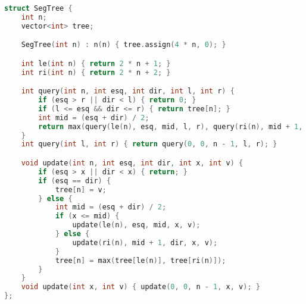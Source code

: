 \documentclass[11pt, a4paper, twoside]{article}
\begin{document}
\begin{lstlisting}[language=C++]
struct SegTree {
    int n;
    vector<int> tree;

    SegTree(int n) : n(n) { tree.assign(4 * n, 0); }

    int le(int n) { return 2 * n + 1; }
    int ri(int n) { return 2 * n + 2; }

    int query(int n, int esq, int dir, int l, int r) {
        if (esq > r || dir < l) { return 0; }
        if (l <= esq && dir <= r) { return tree[n]; }
        int mid = (esq + dir) / 2;
        return max(query(le(n), esq, mid, l, r), query(ri(n), mid + 1, dir, l, r));
    }
    int query(int l, int r) { return query(0, 0, n - 1, l, r); }

    void update(int n, int esq, int dir, int x, int v) {
        if (esq > x || dir < x) { return; }
        if (esq == dir) {
            tree[n] = v;
        } else {
            int mid = (esq + dir) / 2;
            if (x <= mid) {
                update(le(n), esq, mid, x, v);
            } else {
                update(ri(n), mid + 1, dir, x, v);
            }
            tree[n] = max(tree[le(n)], tree[ri(n)]);
        }
    }
    void update(int x, int v) { update(0, 0, n - 1, x, v); }
};
\end{lstlisting}
\end{document}
